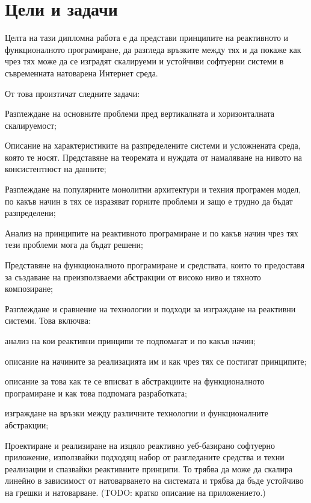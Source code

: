 \section{Цели и задачи}

Целта на тази дипломна работа е да представи принципите на реактивното и функционалното програмиране, да разгледа връзките между тях и да покаже как чрез тях може да се изградят скалируеми и устойчиви софтуерни системи в съвременната натоварена Интернет среда.

От това произтичат следните задачи:
\begin{itemize*}
  \item Разглеждане на основните проблеми пред вертикалната и хоризонталната скалируемост;
  \item Описание на характеристиките на разпределените системи и усложнената среда, която те носят. Представяне на  теоремата и нуждата от намаляване на нивото на консистентност на данните;
  \item Разглеждане на популярните монолитни архитектури и техния програмен модел, по какъв начин в тях се изразяват горните проблеми и защо е трудно да бъдат разпределени;
  \item Анализ на принципите на реактивното програмиране и по какъв начин чрез тях тези проблеми мога да бъдат решени;
  \item Представяне на функционалното програмиране и средствата, които то предоставя за създаване на преизползваеми абстракции от високо ниво и тяхното композиране;
  \item Разглеждане и сравнение на технологии и подходи за изграждане на реактивни системи. Това включва:
  \begin{itemize*}
    \item анализ на кои реактивни принципи те подпомагат и по какъв начин;
    \item описание на начините за реализацията им и как чрез тях се постигат принципите;
    \item описание за това как те се вписват в абстракциите на функционалното програмиране и как това подпомага разработката;
    \item изграждане на връзки между различните технологии и функционалните абстракции;
  \end{itemize*}
  \item Проектиране и реализиране на изцяло реактивно уеб-базирано софтуерно приложение, използвайки подходящ набор от разгледаните средства и техни реализации и спазвайки реактивните принципи. То трябва да може да скалира линейно в зависимост от натоварването на системата и трябва да бъде устойчиво на грешки и натоварване. (TODO: кратко описание на приложението.)

\end{itemize*}
